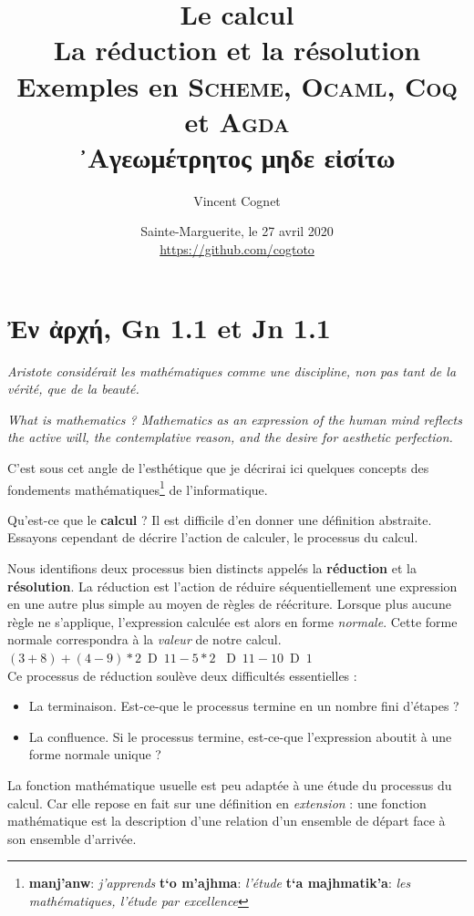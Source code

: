 \documentclass[11pt]{book}
\title{Le calcul \\
     La réduction et la résolution \\
	 Exemples en \textsc{Scheme}, \textsc{Ocaml}, \textsc{Coq} et \textsc{Agda}\\ \vspace{1cm}
   \textgreek{᾿Αγεωμέτρητος μηδε εἰσίτω} \\
      }
\author{Vincent Cognet}
\date{Sainte-Marguerite, le 27 avril 2020 \\
      \url{https://github.com/cogtoto}}
\newcommand{\imp}{{\letterimp D}\hspace{0.1cm}}
\begin{document}
\maketitle
\tableofcontents

\chapter{\textgreek{Ἐν ἀρχή}, Gn 1.1 et Jn 1.1}

\textit{Aristote considérait les mathématiques comme une discipline, non pas tant de la vérité, que de la beauté.}
\cite{ab}


\textit{What is mathematics ? Mathematics as an expression of the human mind reflects
the active will, the contemplative reason, and the desire for aesthetic perfection.} \cite{wm}


C'est sous cet angle de l'esthétique que je décrirai  ici quelques concepts 
 des fondements mathématiques\footnote{\textgreek{\textbf{manj'anw}}: \textit{j'apprends} 
\textgreek{\textbf{t`o m'ajhma}}: \textit{l'étude} 
\textgreek{\textbf{t`a majhmatik'a}}: \textit{les mathématiques, l'étude par excellence}} de l'informatique. \\

 \vspace{0.5cm}

Qu'est-ce que le \textbf{calcul} ? Il est difficile d'en donner une définition abstraite. Essayons cependant de 
décrire l'action de calculer, le processus du calcul. 

Nous identifions deux processus bien distincts appelés la \textbf{réduction} et la \textbf{résolution}.
La réduction est l'action de réduire séquentiellement une expression en une autre plus simple
au moyen de règles de réécriture. Lorsque plus aucune règle ne s'applique, l'expression calculée est alors en forme
\textit{normale}. Cette forme normale correspondra à la \textit{valeur} de notre calcul. \\
$(3+8)+(4-9)*2$ \,\imp\,  $11 -5*2$ \, \imp\, $11 -10$ \,\imp\, $1$ \\

Ce processus de réduction soulève deux difficultés essentielles : 
\begin{itemize}
	\item La terminaison. Est-ce-que le processus termine en un nombre fini d'étapes ?
	\item La confluence. Si le processus termine, est-ce-que l'expression aboutit à une forme normale unique ?
\end{itemize}
\vspace{0.3cm}
La fonction mathématique usuelle est peu adaptée à une étude du processus du calcul. Car elle
repose en fait sur une définition en \textit{extension} : une fonction mathématique est la 
description d'une relation d'un ensemble de départ face à son ensemble d'arrivée.
\end{document}
